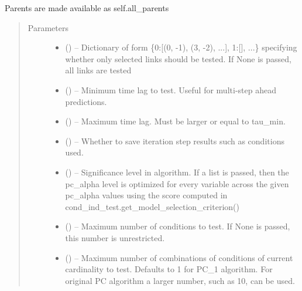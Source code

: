\documentclass[letterpaper,10pt,english]{sphinxmanual}
\begin{document}
\begin{fulllineitems}
\begin{fulllineitems}
Parents are made available as self.all\_parents
\begin{quote}\begin{description}
\item[{Parameters}] \leavevmode\begin{itemize}
\item {} 
 () -- Dictionary of form \{0:{[}(0, -1), (3, -2), ...{]}, 1:{[}{]}, ...\}
specifying whether only selected links should be tested. If None is
passed, all links are tested

\item {} 
 (\sphinxstyleliteralemphasis{, }) -- Minimum time lag to test. Useful for multi-step ahead predictions.

\item {} 
 (\sphinxstyleliteralemphasis{, }) -- Maximum time lag. Must be larger or equal to tau\_min.

\item {} 
 (\sphinxstyleliteralemphasis{, }) -- Whether to save iteration step results such as conditions used.

\item {} 
 (\sphinxstyleliteralemphasis{, }) -- Significance level in algorithm. If a list is passed, then the
pc\_alpha level is optimized for every variable across the given
pc\_alpha values using the score computed in
cond\_ind\_test.get\_model\_selection\_criterion()

\item {} 
 () -- Maximum number of conditions to test. If None is passed, this number
is unrestricted.

\item {} 
 (\sphinxstyleliteralemphasis{, }) -- Maximum number of combinations of conditions of current cardinality
to test. Defaults to 1 for PC\_1 algorithm. For original PC algorithm
a larger number, such as 10, can be used.


\end{itemize}
\end{description}
\end{quote}
\end{fulllineitems}
\end{fulllineitems}
\end{document}
